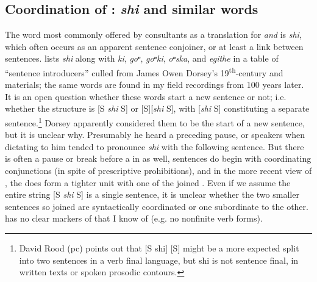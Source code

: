 \documentclass[output=paper]{LSP/langsci}
\begin{document}
\subsection{Coordination of : \textit{shi}  and similar words}  

    The word most commonly offered by  consultants as a translation for \textit{and} is \textit{shi}, which often occurs as an apparent sentence conjoiner, or at least a  link between sentences. \citet[52]{Koontz1984} lists \textit{shi} along with \textit{ki}, \textit{goⁿ}, \textit{goⁿki}, \textit{oⁿska}, and \textit{egithe} in a table of ``sentence introducers'' culled from James Owen Dorsey's 19\textsuperscript{th}-century  and  materials; the same words are found in my field recordings from 100 years later.  It is an open question whether these words start a new sentence or not; i.e. whether the structure is [S \textit{shi} S] or [S][\textit{shi} S], with [\textit{shi} S] constituting a separate sentence.\footnote{David Rood (pc) points out that [S shi] [S] might be a more expected split into two sentences in a verb final language, but shi is not sentence final, in written texts or spoken prosodic contours.}  Dorsey apparently considered them to be the start of a new sentence, but it is unclear why. Presumably he heard a preceding pause, or speakers when dictating to him tended to pronounce \textit{shi} with the following sentence. But there is often a pause or break before a  in  as well, sentences do begin with coordinating conjunctions (in spite of prescriptive prohibitions), and in the more recent view of , the  does form a tighter unit with one of the joined . Even if we assume the entire string [S \textit{shi} S] is a single sentence, it is unclear whether the two smaller sentences so joined are syntactically coordinated or one subordinate to the other.  has no clear markers of  that I know of (e.g. no nonfinite verb forms).  
\end{document}
